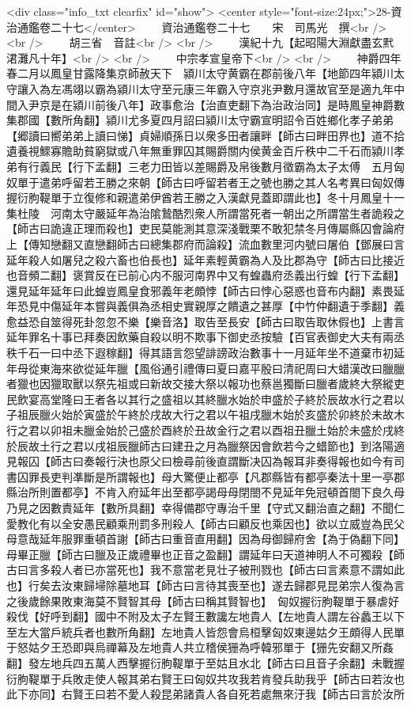 <div class="info_txt clearfix" id="show">
<center style="font-size:24px;">28-資治通鑑卷二十七</center>
  　　資治通鑑卷二十七　　宋　司馬光　撰<br />
<br />
　　胡三省　音註<br />
<br />
　　漢紀十九【起昭陽大淵獻盡玄黓涒灘凡十年】<br />
<br />
　　中宗孝宣皇帝下<br />
<br />
　　神爵四年春二月以鳳皇甘露降集京師赦天下　潁川太守黄霸在郡前後八年【地節四年潁川太守讓入為左馮翊以霸為潁川太守至元康三年霸入守京兆尹數月還故官至是適九年中間入尹京是在潁川前後八年】政事愈治【治直吏翻下為治政治同】是時鳳皇神爵數集郡國【數所角翻】潁川尤多夏四月詔曰潁川太守霸宣明詔令百姓鄉化孝子弟弟【郷讀曰嚮弟弟上讀曰悌】貞婦順孫日以衆多田者讓畔【師古曰畔田界也】道不拾遺養視鰥寡贍助貧窮獄或八年無重罪囚其賜爵關内侯黄金百斤秩中二千石而潁川孝弟有行義民【行下孟翻】三老力田皆以差賜爵及帛後數月徵霸為太子太傅　五月匈奴單于遣弟呼留若王勝之來朝【師古曰呼留若者王之號也勝之其人名考異曰匈奴傳握衍朐鞮單于立復修和親遣弟伊酋若王勝之入漢獻見蓋即謂此也】冬十月鳳皇十一集杜陵　河南太守嚴延年為治隂鷙酷烈衆人所謂當死者一朝出之所謂當生者詭殺之【師古曰詭違正理而殺也】吏民莫能測其意深淺戰栗不敢犯禁冬月傳屬縣囚會論府上【傳知戀翻又直戀翻師古曰總集郡府而論殺】流血數里河内號曰屠伯【鄧展曰言延年殺人如屠兒之殺六畜也伯長也】延年素輕黄霸為人及比郡為守【師古曰比接近也音頻二翻】褒賞反在已前心内不服河南界中又有蝗蟲府丞義出行蝗【行下孟翻】還見延年延年曰此蝗豈鳳皇食邪義年老頗悖【師古曰悖心惡惑也音布内翻】素畏延年恐見中傷延年本嘗與義俱為丞相史實親厚之饋遺之甚厚【中竹仲翻遺于季翻】義愈益恐自筮得死卦忽忽不樂【樂音洛】取告至長安【師古曰取告取休假也】上書言延年罪名十事已拜奏因飲藥自殺以明不欺事下御史丞按驗【百官表御史大夫有兩丞秩千石一曰中丞下遐稼翻】得其語言怨望誹謗政治數事十一月延年坐不道棄市初延年母從東海來欲從延年臘【風俗通引禮傳曰夏曰嘉平殷曰清祀周曰大蜡漢改曰臘臘者獵也因獵取獸以祭先祖或曰新故交接大祭以報功也蔡邕獨斷曰臘者歲終大祭縱吏民飲宴高堂隆曰王者各以其行之盛祖以其終臘水始於申盛於子終於辰故水行之君以子祖辰臘火始於寅盛於午終於戌故大行之君以午祖戌臘木始於亥盛於卯終於未故木行之君以卯祖未臘金始於己盛於酉終於丑故金行之君以酉祖丑臘土始於未盛於戌終於辰故土行之君以戌祖辰臘師古曰建丑之月為臘祭因會飲若今之蜡節也】到洛陽適見報囚【師古曰奏報行決也原父曰檢尋前後直謂斷决囚為報耳非奏得報也如今有司書囚罪長吏判凖斷是所謂報也】母大驚便止都亭【凡郡縣皆有都亭秦法十里一亭郡縣治所則置都亭】不肯入府延年出至都亭謁母母閉閤不見延年免冠頓首閤下良久母乃見之因數責延年【數所具翻】幸得備郡守專治千里【守式又翻治直之翻】不聞仁愛教化有以全安愚民顧乘刑罰多刑殺人【師古曰顧反也乘因也】欲以立威豈為民父母意哉延年服罪重頓首謝【師古曰重音直用翻】因為母御歸府舍【為于偽翻下同】母畢正臘【師古曰臘及正歲禮畢也正音之盈翻】謂延年曰天道神明人不可獨殺【師古曰言多殺人者已亦當死也】我不意當老見壮子被刑戮也【師古曰言素意不謂如此也】行矣去汝東歸埽除墓地耳【師古曰言待其喪至也】遂去歸郡見昆弟宗人復為言之後歲餘果敗東海莫不賢智其母【師古曰稱其賢智也】　匈奴握衍朐鞮單于暴虐好殺伐【好呼到翻】國中不附及太子左賢王數讒左地貴人【左地貴人謂左谷蠡王以下至左大當戶統兵者也數所角翻】左地貴人皆怨會烏桓擊匈奴東邊姑夕王頗得人民單于怒姑夕王恐即與烏禪幕及左地貴人共立稽侯㹪為呼韓邪單于【㹪先安翻又所姦翻】發左地兵四五萬人西擊握衍朐鞮單于至姑且水北【師古曰且音子余翻】未戰握衍朐鞮單于兵敗走使人報其弟右賢王曰匈奴共攻我若肯發兵助我乎【師古曰若汝也此下亦同】右賢王曰若不愛人殺昆弟諸貴人各自死若處無來汙我【師古曰言於汝所